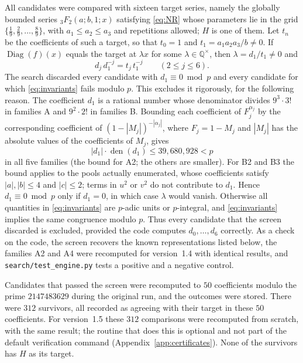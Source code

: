 \documentclass[11pt]{amsart}
\theoremstyle{definition}
\theoremstyle{remark}
\numberwithin{equation}{section}
\newcommand{\Q}{\mathbb{Q}}
\DeclareMathOperator{\Diag}{Diag}
\begin{document}
All candidates were compared with sixteen target series, namely the globally bounded series ${}_3F_2(a;b,1;x)$ satisfying \eqref{eq:NR} whose parameters lie in the grid $\{\frac19,\frac29,\dots,\frac89\}$, with $a_1\le a_2\le a_3$ and repetitions allowed; $H$ is one of them. Let $t_n$ be the coefficients of such a target, so that $t_0=1$ and $t_1=a_1a_2a_3/b\ne0$. If $\Diag(f)(x)$ equals the target at $\lambda x$ for some $\lambda\in\Q^\times$, then $\lambda=d_1/t_1\ne0$ and
\begin{equation}\label{eq:invariants}
d_j\,d_1^{-j}=t_j\,t_1^{-j}\qquad(2\le j\le6).
\end{equation}
The search discarded every candidate with $d_1\equiv0\bmod p$ and every candidate for which \eqref{eq:invariants} fails modulo $p$. This excludes it rigorously, for the following reason. The coefficient $d_1$ is a rational number whose denominator divides $9^3\cdot3!$ in families A and $9^2\cdot2!$ in families B. Bounding each coefficient of $F_j^{\alpha_j}$ by the corresponding coefficient of $(1-|M_j|)^{-|\alpha_j|}$, where $F_j=1-M_j$ and $|M_j|$ has the absolute values of the coefficients of $M_j$, gives
\begin{equation}\label{eq:d1bound}
|d_1|\cdot\operatorname{den}(d_1)\le39{,}680{,}928<p
\end{equation}
in all five families (the bound for A2; the others are smaller). For B2 and B3 the bound applies to the pools actually enumerated, whose coefficients satisfy $|a|,|b|\le4$ and $|c|\le2$; terms in $u^2$ or $v^2$ do not contribute to $d_1$. Hence $d_1\equiv0\bmod p$ only if $d_1=0$, in which case $\lambda$ would vanish. Otherwise all quantities in \eqref{eq:invariants} are $p$-adic units or $p$-integral, and \eqref{eq:invariants} implies the same congruence modulo $p$. Thus every candidate that the screen discarded is excluded, provided the code computes $d_0,\dots,d_6$ correctly. As a check on the code, the screen recovers the known representations listed below, the families A2 and A4 were recomputed for version~1.4 with identical results, and \texttt{search/test\_engine.py} tests a positive and a negative control.

Candidates that passed the screen were recomputed to $50$ coefficients modulo the prime $2147483629$ during the original run, and the outcomes were stored. There were $312$ survivors, all recorded as agreeing with their target in these $50$ coefficients. For version~1.5 these $312$ comparisons were recomputed from scratch, with the same result; the routine that does this is optional and not part of the default verification command (Appendix~\ref{app:certificates}). None of the survivors has $H$ as its target.
\end{document}
